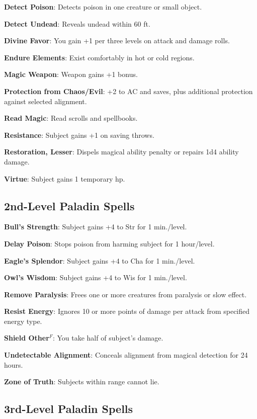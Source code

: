 \textbf{Detect Poison}: Detects poison in one creature or small object.

\textbf{Detect Undead}: Reveals undead within 60 ft.

\textbf{Divine Favor}: You gain +1 per three levels on attack and damage rolls.

\textbf{Endure Elements}: Exist comfortably in hot or cold regions.

\textbf{Magic Weapon}: Weapon gains +1 bonus.

\textbf{Protection from Chaos/Evil}: +2 to AC and saves, plus additional protection against selected alignment.

\textbf{Read Magic}: Read scrolls and spellbooks.

\textbf{Resistance}: Subject gains +1 on saving throws.

\textbf{Restoration, Lesser}: Dispels magical ability penalty or repairs 1d4 ability damage.

\textbf{Virtue}: Subject gains 1 temporary hp.

\subsection{2nd-Level Paladin Spells}


\textbf{Bull's Strength}: Subject gains +4 to Str for 1 min./level.

\textbf{Delay Poison}: Stops poison from harming subject for 1 hour/level.

\textbf{Eagle's Splendor}: Subject gains +4 to Cha for 1 min./level.

\textbf{Owl's Wisdom}: Subject gains +4 to Wis for 1 min./level.

\textbf{Remove Paralysis}: Frees one or more creatures from paralysis or slow effect.

\textbf{Resist Energy}: Ignores 10 or more points of damage per attack from specified energy type.

\textbf{Shield Other}\(^{F}\): You take half of subject's damage.

\textbf{Undetectable Alignment}: Conceals alignment from magical detection for 24 hours.

\textbf{Zone of Truth}: Subjects within range cannot lie.

\subsection{3rd-Level Paladin Spells}


